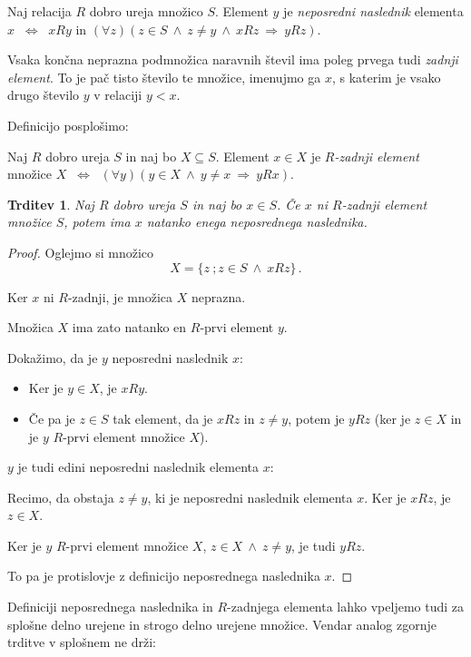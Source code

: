 \documentclass[11pt,paper=b5,DIV=13,headinclude,footinclude]{scrbook}
\def\inn {{~\wedge~}}
\def\sledi {{~\Rightarrow~}}
\def\cee {{~\Leftrightarrow~}}
\newtheorem*{trditev}{Trditev}
\begin{document}
\medskip
Naj relacija $R$ dobro ureja množico $S$. Element $y$ je {\em neposredni naslednik} elementa $x$ $\cee$ $xRy$ in $(\forall z)(z\in S\inn z\neq y\inn xRz\sledi yRz)$.

\bigskip
Vsaka končna neprazna podmnožica naravnih števil ima poleg prvega tudi {\em zadnji element}.
To je pač tisto število te množice, imenujmo ga $x$, s katerim je vsako drugo število $y$ v relaciji $y<x$.

\medskip
Definicijo posplošimo:

Naj $R$ dobro ureja $S$ in naj bo $X\subseteq S$. Element $x\in X$ je {\em $R$-zadnji element} množice $X$ $\cee$ $(\forall y)(y\in X\inn y\neq x\sledi yRx)$.

\bigskip

\begin{trditev}
Naj $R$ dobro ureja $S$ in naj bo $x\in S$. Če $x$ ni $R$-zadnji element množice $S$, potem ima $x$ natanko enega neposrednega naslednika.
\end{trditev}

\begin{proof}
Oglejmo si množico
$$X = \{z~;z\in S\inn xRz\}\,.$$

Ker $x$ ni $R$-zadnji, je množica $X$ neprazna.

Množica $X$ ima zato natanko en $R$-prvi element $y$.

Dokažimo, da je $y$ neposredni naslednik $x$:
\begin{itemize}
  \item Ker je $y\in X$, je $xRy$.
  \item Če pa je $z\in S$ tak element, da je $xRz$ in $z\neq y$, potem je
$yRz$ (ker je $z\in X$ in je $y$ $R$-prvi element množice $X$).
\end{itemize}

$y$ je tudi edini neposredni naslednik elementa $x$:

Recimo, da obstaja $z\neq y$, ki je neposredni naslednik elementa $x$.
Ker je $xRz$, je $z\in X$.

Ker je $y$ $R$-prvi element množice $X$, $z\in X\inn z\neq y$,
je tudi $yRz$.

To pa je protislovje z definicijo neposrednega naslednika $x$.
\end{proof}

Definiciji neposrednega naslednika in $R$-zadnjega elementa lahko vpeljemo tudi za splošne delno urejene in strogo delno urejene množice. Vendar analog zgornje trditve v splošnem ne drži:
\end{document}
